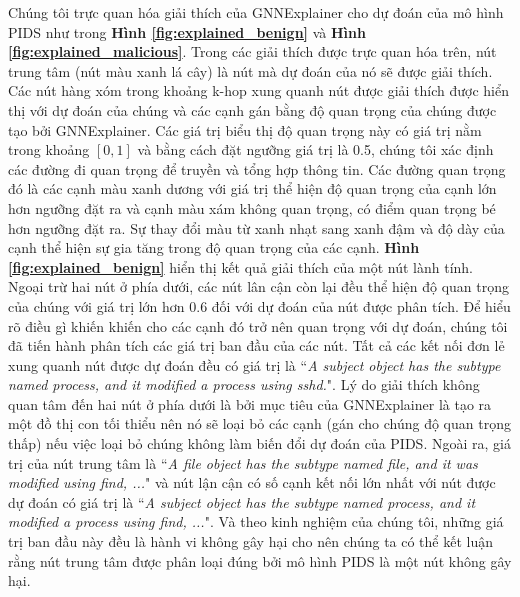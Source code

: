 Chúng tôi trực quan hóa giải thích của GNNExplainer cho dự đoán của mô hình PIDS như trong \textbf{Hình \ref{fig:explained_benign}} và \textbf{Hình \ref{fig:explained_malicious}}. Trong các giải thích được trực quan hóa trên, nút trung tâm (nút màu xanh lá cây) là nút mà dự đoán của nó sẽ được giải thích. Các nút hàng xóm trong khoảng k-hop xung quanh nút được giải thích được hiển thị với dự đoán của chúng và các cạnh gán bằng độ quan trọng của chúng được tạo bởi GNNExplainer. Các giá trị biểu thị độ quan trọng này có giá trị nằm trong khoảng $[0, 1]$ và bằng cách đặt ngưỡng giá trị là 0.5, chúng tôi xác định các đường đi quan trọng để truyền và tổng hợp thông tin. Các đường quan trọng đó là các cạnh màu xanh dương với giá trị thể hiện độ quan trọng của cạnh lớn hơn ngưỡng đặt ra và cạnh màu xám không quan trọng, có điểm quan trọng bé hơn ngưỡng đặt ra. Sự thay đổi màu từ xanh nhạt sang xanh đậm và độ dày của cạnh thể hiện sự gia tăng trong độ quan trọng của các cạnh.
\bigbreak\noindent
\textbf{Hình \ref{fig:explained_benign}} hiển thị kết quả giải thích của một nút lành tính. Ngoại trừ hai nút ở phía dưới, các nút lân cận còn lại đều thể hiện độ quan trọng của chúng với giá trị lớn hơn 0.6 đối với dự đoán của nút được phân tích. Để hiểu rõ điều gì khiến khiến cho các cạnh đó trở nên quan trọng với dự đoán, chúng tôi đã tiến hành phân tích các giá trị ban đầu của các nút. Tất cả các kết nối đơn lẻ xung quanh nút được dự đoán đều có giá trị là ``\emph{A subject object has the subtype named process, and it modified a process using sshd.}". Lý do giải thích không quan tâm đến hai nút ở phía dưới là bởi mục tiêu của GNNExplainer là tạo ra một đồ thị con tối thiểu nên nó sẽ loại bỏ các cạnh (gán cho chúng độ quan trọng thấp) nếu việc loại bỏ chúng không làm biến đổi dự đoán của PIDS. Ngoài ra, giá trị của nút trung tâm là ``\emph{A file object has the subtype named file, and it was modified using find, ...}" và nút lận cận có số cạnh kết nối lớn nhất với nút được dự đoán có giá trị là ``\emph{A subject object has the subtype named process, and it modified a process using find, ...}". Và theo kinh nghiệm của chúng tôi, những giá trị ban đầu này đều là hành vi không gây hại cho nên chúng ta có thể kết luận rằng nút trung tâm được phân loại đúng bởi mô hình PIDS là một nút không gây hại.


